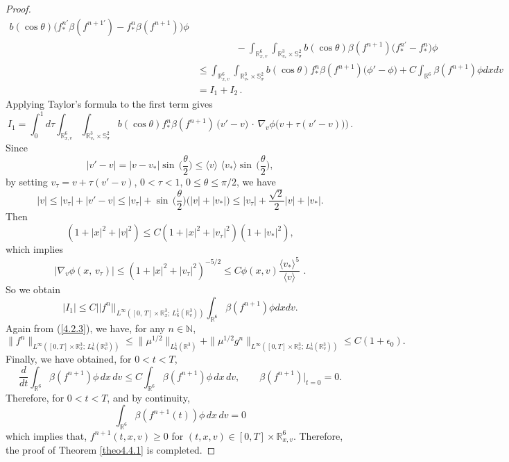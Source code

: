 \documentclass{amsart}[12pt, article]
\begin{document}
\begin{proof}
\begin{align*}
b(\cos\theta) \Big( f^{n'}_\ast \beta (f^{n+1 '}) - f^n_\ast \beta
(f^{n+1})\Big) \phi\\
&\qquad\qquad- \int_{{{{\mathbb R}}}^6_{x,
v}}\int_{{{{\mathbb R}}}^3_{v_*}\times{\mathbb{S}}^2_\sigma} b(\cos\theta)\beta
(f^{n+1}) \Big( f^{n'}_\ast -f^n_\ast \Big)\phi\\
& \leq  \int_{{{{\mathbb R}}}^6_{x,
v}}\int_{{{{\mathbb R}}}^3_{v_*}\times{\mathbb{S}}^2_\sigma} b(\cos\theta)  f^{n}_\ast
\beta (f^{n+1 })
 \Big ( \phi' - \phi \Big)
+C \int_{{{{\mathbb R}}}^6}  \beta (f^{n+1}) \phi dxdv \\
&=I_1+I_2 \,.
\end{align*}
Applying Taylor's formula to the first term gives
$$
 I_1 = \int_0^1 d \tau  \int_{{{{\mathbb R}}}^6_{x,
v}}\int_{{{{\mathbb R}}}^3_{v_*}\times{\mathbb{S}}^2_\sigma} b(\cos\theta)  f^{n}_\ast
\beta (f^{n+1 })\,\big(v'-v\big)\, \cdot\,  \nabla_v \phi  \Big(v+
\tau (v'-v))\Big) \,.
$$
Since
\begin{equation}\label{4.2.8}
|v' -v|=|v-v_*|\sin\,\Big(\frac\theta 2\Big) \leq  \langle v \rangle
\,\,\langle v_* \rangle \sin\,\Big(\frac\theta 2\Big),
\end{equation}
by setting $v_\tau = v+ \tau (v'-v)$, $0<\tau<1$, $0\leq\theta\leq
\pi/2$, we have
$$
|v| \leq |v_\tau| + |v'-v|\leq |v_\tau| +  \sin\,\Big(\frac\theta
2\Big)\Big(|v|+|v_*|\Big)\leq |v_\tau| + \frac{\sqrt 2
}{2}|v|+|v_*|.
$$
Then
$$
(1+|x|^2+|v|^2) \leq C(1+|x|^2+|v_\tau|^2)(1 + |v_*|^2),
$$
which implies
$$
|\nabla_v \phi (x,\, v_\tau)| \leq (1+|x|^2+|v_\tau|^2)^{-5/2}\leq C
\phi(x,v) \frac{\langle v_* \rangle^5}{\langle v \rangle}\,\, .
$$
So we obtain
$$|I_1| \leq C ||f^n||_{L^\infty([0,\, T]\times{{{\mathbb R}}}_x^3;\, L^1_{6}({{{\mathbb R}}}^3_v))}
\int_{{{{\mathbb R}}}^6}  \beta (f^{n+1}) \phi dxdv.
$$
Again {}from (\ref{4.2.3}), we have, for any $n\in{{\mathbb N}}$,
\begin{equation*}
\|f^n\|_{L^\infty([0, T]\times{{{\mathbb R}}}^3_x;\, L^1_6({{{\mathbb R}}}^3_v))} \leq
\|\mu^{1/2}\|_{L^1_6({{{\mathbb R}}}^3)} + \|\mu^{1/2} g^n\|_{L^\infty([0,
T]\times{{{\mathbb R}}}^3_x;\, L^1_6({{{\mathbb R}}}^3_v))}\leq C (1+\epsilon_0).
\end{equation*}
Finally, we have obtained, for $0<t<T$,
$$
 \frac{d}{dt} \int_{{{{\mathbb R}}}^6}\beta
(f^{n+1})\phi\, dx\,dv \leq C \int_{{{{\mathbb R}}}^6} \beta (f^{n+1})\phi
\,dx\,dv ,\qquad \beta (f^{n+1})|_{t=0} = 0.
$$
Therefore, for $0<t<T$, and by continuity,
$$
\int_{{{{\mathbb R}}}^6} \beta(f^{n+1}(t))\phi \,dx\,dv=0
$$
which implies that, $f^{n+1}(t, x, v) \geq 0$ for $(t, x, v)\in [0,
T]\times{{{\mathbb R}}}^6_{x, v}$. Therefore,  the proof of Theorem \ref{theo4.4.1}
is completed.
\end{proof}
\end{document}
